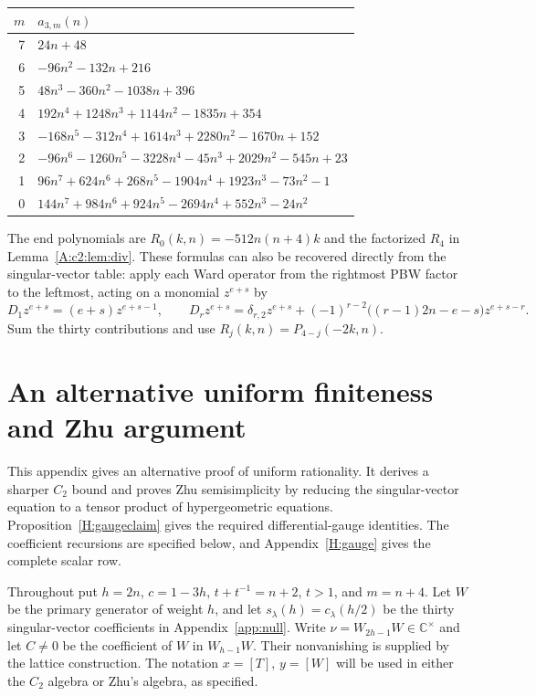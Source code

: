 \documentclass[11pt]{article}
\newcommand{\C}{\mathbb C}\newcommand{\Q}{\mathbb Q}\newcommand{\Z}{\mathbb Z}
\numberwithin{equation}{section}
\begin{document}
\begin{center}\small\begin{tabular}{@{}r l@{}}\toprule
$m$ & $a_{3,m}(n)$\\\midrule
7 & $24 n + 48$ \\
6 & $- 96 n^{2} - 132 n + 216$ \\
5 & $48 n^{3} - 360 n^{2} - 1038 n + 396$ \\
4 & $192 n^{4} + 1248 n^{3} + 1144 n^{2} - 1835 n + 354$ \\
3 & $- 168 n^{5} - 312 n^{4} + 1614 n^{3} + 2280 n^{2} - 1670 n + 152$ \\
2 & $- 96 n^{6} - 1260 n^{5} - 3228 n^{4} - 45 n^{3} + 2029 n^{2} - 545 n + 23$ \\
1 & $96 n^{7} + 624 n^{6} + 268 n^{5} - 1904 n^{4} + 1923 n^{3} - 73 n^{2} - 1$ \\
0 & $144 n^{7} + 984 n^{6} + 924 n^{5} - 2694 n^{4} + 552 n^{3} - 24 n^{2}$ \\
\bottomrule\end{tabular}\end{center}
The end polynomials are $R_0(k,n)=-512n(n+4)k$ and the factorized $R_4$ in Lemma~\ref{A:c2:lem:div}. These formulas can also be recovered directly from the singular-vector table: apply each Ward operator from the rightmost PBW factor to the leftmost, acting on a monomial $z^{e+s}$ by
\[
D_1z^{e+s}=(e+s)z^{e+s-1},\qquad
D_rz^{e+s}=\delta_{r,2}z^{e+s}+(-1)^{r-2}\bigl((r-1)2n-e-s\bigr)z^{e+s-r}.
\]
Sum the thirty contributions and use $R_j(k,n)=P_{4-j}(-2k,n)$.

\section{An alternative uniform finiteness and Zhu argument}\label{H:uniform}
This appendix gives an alternative proof of uniform rationality. It derives a sharper $C_2$ bound and proves Zhu semisimplicity by reducing the singular-vector equation to a tensor product of hypergeometric equations. Proposition~\ref{H:gaugeclaim} gives the required differential-gauge identities. The coefficient recursions are specified below, and Appendix~\ref{H:gauge} gives the complete scalar row.

Throughout put $h=2n$, $c=1-3h$, $t+t^{-1}=n+2$, $t>1$, and $m=n+4$. Let $W$ be the primary generator of weight $h$, and let $s_\lambda(h)=c_\lambda(h/2)$ be the thirty singular-vector coefficients in Appendix~\ref{app:null}. Write $\nu=W_{2h-1}W\in\C^\times$ and let $C\ne0$ be the coefficient of $W$ in $W_{h-1}W$. Their nonvanishing is supplied by the lattice construction. The notation $x=[T]$, $y=[W]$ will be used in either the $C_2$ algebra or Zhu's algebra, as specified.
\end{document}
